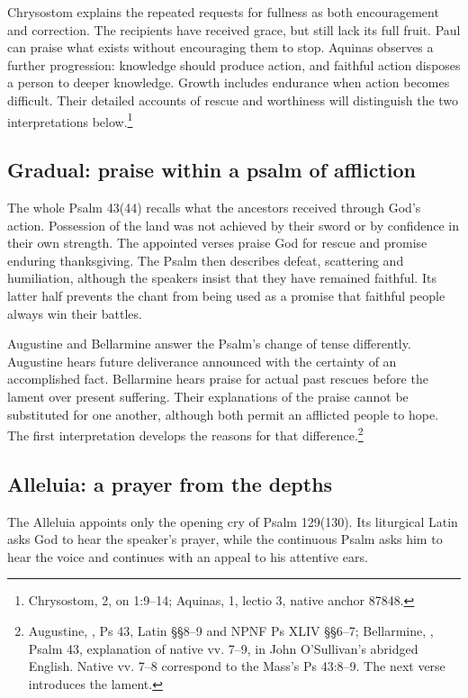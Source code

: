 Chrysostom explains the repeated requests for fullness as both
encouragement and correction. The recipients have received grace,
but still lack its full fruit. Paul can praise what exists without
encouraging them to stop. Aquinas observes a further progression:
knowledge should produce action, and faithful action disposes a person
to deeper knowledge. Growth includes endurance when action becomes
difficult. Their detailed accounts of rescue and worthiness will
distinguish the two interpretations below.\footnote{Chrysostom,
 2, on 1:9--14; Aquinas,
 1, lectio 3, native anchor 87848.}

\subsection{Gradual: praise within a psalm of affliction}

The whole Psalm 43(44) recalls what the ancestors received through God's
action. Possession of the land was not achieved by their sword or by
confidence in their own strength. The appointed verses praise God for
rescue and promise enduring thanksgiving. The Psalm then describes
defeat, scattering and humiliation, although the speakers insist that
they have remained faithful. Its latter half prevents the chant from
being used as a promise that faithful people always win their battles.

Augustine and Bellarmine answer the Psalm's change of tense differently.
Augustine hears future deliverance announced with the certainty of an
accomplished fact. Bellarmine hears praise for actual past rescues before
the lament over present suffering. Their explanations of the praise
cannot be substituted for one another, although both permit an afflicted
people to hope. The first interpretation develops the reasons for that
difference.\footnote{Augustine, , Ps 43,
Latin §§8--9 and NPNF Ps XLIV §§6--7; Bellarmine,
, Psalm 43,
explanation of native vv. 7--9, in John O'Sullivan's abridged English.
Native vv. 7--8 correspond to the Mass's Ps 43:8--9. The next
verse introduces the lament.}

\subsection{Alleluia: a prayer from the depths}

The Alleluia appoints only the opening cry of Psalm 129(130). Its
liturgical Latin asks God to hear the speaker's prayer, while the
continuous Psalm asks him to hear the voice and continues with an
appeal to his attentive ears.

